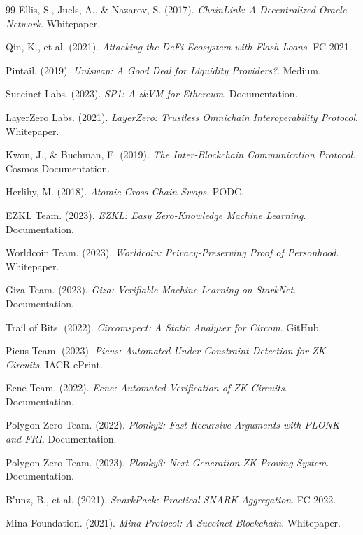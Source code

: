 \documentclass[11pt,a4paper,twoside]{book}
\begin{document}
\begin{thebibliography}{99}
 Ellis, S., Juels, A., \& Nazarov, S. (2017). \textit{ChainLink: A Decentralized Oracle Network}. Whitepaper.

 Qin, K., et al. (2021). \textit{Attacking the DeFi Ecosystem with Flash Loans}. FC 2021.

 Pintail. (2019). \textit{Uniswap: A Good Deal for Liquidity Providers?}. Medium.

 Succinct Labs. (2023). \textit{SP1: A zkVM for Ethereum}. Documentation.

 LayerZero Labs. (2021). \textit{LayerZero: Trustless Omnichain Interoperability Protocol}. Whitepaper.

 Kwon, J., \& Buchman, E. (2019). \textit{The Inter-Blockchain Communication Protocol}. Cosmos Documentation.

 Herlihy, M. (2018). \textit{Atomic Cross-Chain Swaps}. PODC.

 EZKL Team. (2023). \textit{EZKL: Easy Zero-Knowledge Machine Learning}. Documentation.


 Worldcoin Team. (2023). \textit{Worldcoin: Privacy-Preserving Proof of Personhood}. Whitepaper.

 Giza Team. (2023). \textit{Giza: Verifiable Machine Learning on StarkNet}. Documentation.

 Trail of Bits. (2022). \textit{Circomspect: A Static Analyzer for Circom}. GitHub.

 Picus Team. (2023). \textit{Picus: Automated Under-Constraint Detection for ZK Circuits}. IACR ePrint.

 Ecne Team. (2022). \textit{Ecne: Automated Verification of ZK Circuits}. Documentation.

 Polygon Zero Team. (2022). \textit{Plonky2: Fast Recursive Arguments with PLONK and FRI}. Documentation.

 Polygon Zero Team. (2023). \textit{Plonky3: Next Generation ZK Proving System}. Documentation.

 B\''unz, B., et al. (2021). \textit{SnarkPack: Practical SNARK Aggregation}. FC 2022.

 Mina Foundation. (2021). \textit{Mina Protocol: A Succinct Blockchain}. Whitepaper.


\end{thebibliography}
\end{document}

